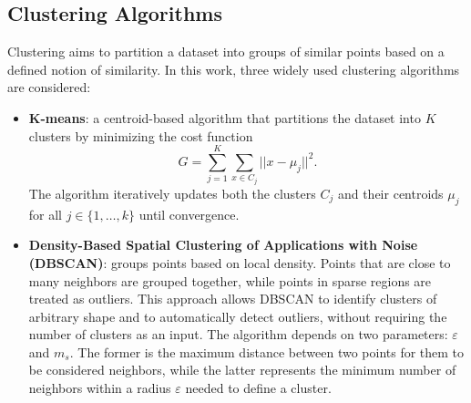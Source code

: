 \documentclass[prl,twocolumn]{revtex4-1}
\begin{document}
\subsection{Clustering Algorithms}
\vspace{-1em}
\noindent Clustering aims to partition a dataset into groups of similar points based on a defined notion of similarity.
In this work, three widely used clustering algorithms are considered:
\vspace{-0.5em}
\begin{itemize}[leftmargin=0pt, itemsep=0pt]
    \item[] \textbf{K-means}:
    a centroid-based algorithm that partitions the dataset into $K$ clusters by minimizing the cost function
    \begin{equation}
        G=\sum_{j=1}^{K}\sum_{x\in C_j}||x-\mu_j||^2.
    \end{equation}
    The algorithm iteratively updates both the clusters $C_j$ and their centroids $\mu_j$ for all $j\in\{1,\ldots,k\}$ until convergence.

    \item[] \textbf{Density-Based Spatial Clustering of Applications with Noise (DBSCAN)}:
    groups points based on local density.
    Points that are close to many neighbors are grouped together, while points in sparse regions are treated as outliers.
    This approach allows DBSCAN to identify clusters of arbitrary shape and to automatically detect outliers, without requiring the number of clusters as an input. The algorithm depends on two parameters: $\varepsilon$ and $m_s$. The former is the maximum distance between two points for them to be considered neighbors, while the latter represents the minimum number of neighbors within a radius $\varepsilon$ needed to define a cluster.
    
    

\end{itemize}
\end{document}
